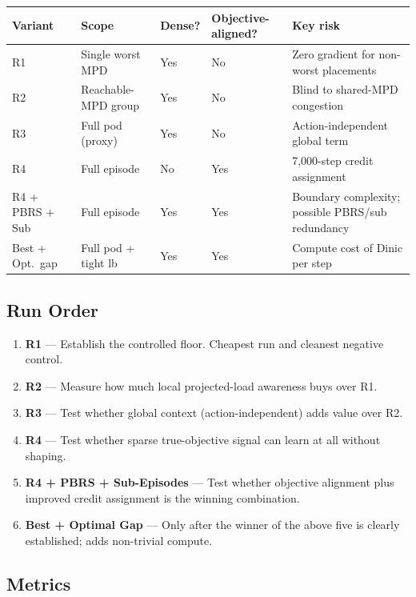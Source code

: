 \documentclass[11pt]{article}
\begin{document}
\begin{center}
\small
\renewcommand{\arraystretch}{1.3}
\begin{tabular}{p{3.2cm}p{2.8cm}ll p{3.8cm}}
\toprule
\textbf{Variant} & \textbf{Scope} & \textbf{Dense?} &
  \textbf{Objective-aligned?} & \textbf{Key risk} \\
\midrule
R1 & Single worst MPD & Yes & No &
  Zero gradient for non-worst placements \\
R2 & Reachable-MPD group & Yes & No &
  Blind to shared-MPD congestion \\
R3 & Full pod (proxy) & Yes & No &
  Action-independent global term \\
R4 & Full episode & No & Yes &
  7{,}000-step credit assignment \\
R4 + PBRS + Sub & Full episode & Yes & Yes &
  Boundary complexity; possible PBRS/sub redundancy \\
Best + Opt.\ gap & Full pod + tight lb & Yes & Yes &
  Compute cost of Dinic per step \\
\bottomrule
\end{tabular}
\end{center}

\subsection{Run Order}

\begin{enumerate}
  \item \textbf{R1} --- Establish the controlled floor.  Cheapest run and
        cleanest negative control.
  \item \textbf{R2} --- Measure how much local projected-load awareness
        buys over R1.
  \item \textbf{R3} --- Test whether global context (action-independent)
        adds value over R2.
  \item \textbf{R4} --- Test whether sparse true-objective signal can
        learn at all without shaping.
  \item \textbf{R4 + PBRS + Sub-Episodes} --- Test whether objective
        alignment plus improved credit assignment is the winning
        combination.
  \item \textbf{Best + Optimal Gap} --- Only after the winner of the
        above five is clearly established; adds non-trivial compute.
\end{enumerate}

\subsection{Metrics}
\end{document}
